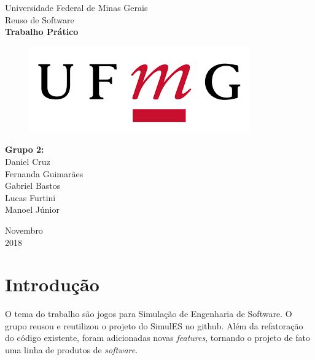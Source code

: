 \documentclass[11pt]{article}
\date{\today}
\title{}
\begin{document}
\begin{titlepage}
	\begin{center}
		\Huge{Universidade Federal de Minas Gerais}\\
		\vspace{15pt}
    \Large{Reuso de Software}\\
    \vspace{95pt}
    \textbf{\LARGE{Trabalho Prático}}\\
		\vspace{3,5cm}
    \begin{figure}[h]
      \begin{center}
        \includegraphics[scale = 0.50]{img/ufmg-logo.png}
      \end{center}
     \label{fig:graph}
    \end{figure}
	\end{center}
  \begin{flushleft}
		\begin{tabbing}
        \textbf{Grupo 2:}\\
        Daniel Cruz \\
			  Fernanda Guimarães \\
        Gabriel Bastos \\
        Lucas Furtini \\
        Manoel Júnior
	    \end{tabbing}
  \end{flushleft}
	\vspace{1cm} 
	\begin{center}
		\vspace{\fill}
		Novembro\\
		2018
	\end{center}
\end{titlepage}
\section{Introdução}
\label{sec:org5f82a3e}
O tema do trabalho são jogos para Simulação de Engenharia de Software. O grupo reusou e
reutilizou o projeto do SimulES no github. Além da refatoração do código existente,
foram adicionadas novas \emph{features}, tornando o projeto de fato uma linha de produtos de
\emph{software}.
\end{document}
